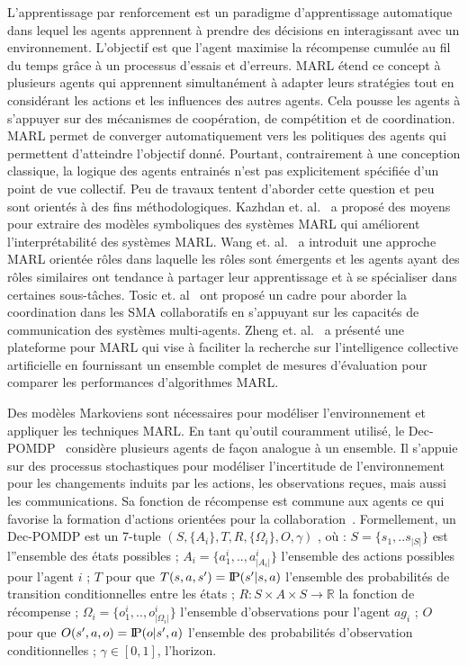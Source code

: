 \documentclass[contribution]{jfsma}
\newcommand{\probP}{\text{I\kern-0.15em P}}
\begin{document}
L'apprentissage par renforcement est un paradigme d'apprentissage automatique dans lequel les agents apprennent à prendre des décisions en interagissant avec un environnement. L’objectif est que l’agent maximise la récompense cumulée au fil du temps grâce à un processus d’essais et d’erreurs.
MARL étend ce concept à plusieurs agents qui apprennent simultanément à adapter leurs stratégies tout en considérant les actions et les influences des autres agents. Cela pousse les agents à s’appuyer sur des mécanismes de coopération, de compétition et de coordination.
MARL permet de converger automatiquement vers les politiques des agents qui permettent d'atteindre l'objectif donné. Pourtant, contrairement à une conception classique, la logique des agents entrainés n'est pas explicitement spécifiée d'un point de vue collectif. Peu de travaux tentent d’aborder cette question et peu sont orientés à des fins méthodologiques.
Kazhdan et. al.~\cite{Kazhdan2020} a proposé des moyens pour extraire des modèles symboliques des systèmes MARL qui améliorent l'interprétabilité des systèmes MARL.
Wang et. al.~\cite{Wang2020} a introduit une approche MARL orientée rôles dans laquelle les rôles sont émergents et les agents ayant des rôles similaires ont tendance à partager leur apprentissage et à se spécialiser dans certaines sous-tâches.
Tosic et. al~\cite{Tosic2010} ont proposé un cadre pour aborder la coordination dans les SMA collaboratifs en s'appuyant sur les capacités de communication des systèmes multi-agents.
Zheng et. al.~\cite{Zheng2018} a présenté une plateforme pour MARL qui vise à faciliter la recherche sur l'intelligence collective artificielle en fournissant un ensemble complet de mesures d'évaluation pour comparer les performances d'algorithmes MARL.

Des modèles Markoviens sont nécessaires pour modéliser l'environnement et appliquer les techniques MARL. En tant qu'outil couramment utilisé, le Dec-POMDP~\cite{Oliehoek2016} considère plusieurs agents de façon analogue à un ensemble. Il s'appuie sur des processus stochastiques pour modéliser l'incertitude de l'environnement pour les changements induits par les actions, les observations reçues, mais aussi les communications. Sa fonction de récompense est commune aux agents ce qui favorise la formation d'actions orientées pour la collaboration~\cite{Beynier2013}. Formellement, un Dec-POMDP est un 7-tuple $(S,\{A_i\},T,R,\{\Omega_i\},O,\gamma)$ , où : $S = \{s_1, .. s_{|S|}\}$ est l''ensemble des états possibles ; $A_{i} = \{a_{1}^{i},..,a_{|A_{i}|}^{i}\}$ l'ensemble des actions possibles pour l'agent $i$ ; $T$ pour que $T(s,a,s') = \probP{(s'|s,a)}$ l'ensemble des probabilités de transition conditionnelles entre les états ; $R : S \times A \times S \rightarrow \mathbb{R}$ la fonction de récompense ; $\Omega_{i} = \{o_{1}^{i},..,o_{|\Omega_{i}|}^{i}\}$  l'ensemble d'observations pour l'agent $ag_i$ ; $O$ pour que $O(s',a,o) = \probP{(o|s',a)}$  l'ensemble des probabilités d'observation conditionnelles ; $\gamma \in [0,1]$, l'horizon.
\end{document}
